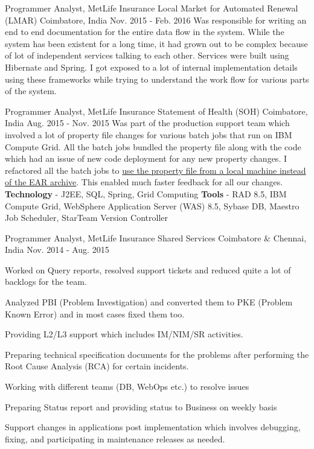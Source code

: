\begin{cventries}
  \cventry
    {Programmer Analyst, MetLife Insurance} %
    {Local Market for Automated Renewal (LMAR)} %
    {Coimbatore, India} %
    {Nov. 2015 - Feb. 2016} %
    {
        Was responsible for writing an end to end documentation for the entire data flow in the system. While the system has been existent for a long time, it had grown out to be complex because of lot of independent services talking to each other. Services were built using Hibernate and Spring. I got exposed to a lot of internal implementation details using these frameworks while trying to understand the work flow for various parts of the system.
    }

  \cventry
    {Programmer Analyst, MetLife Insurance} %
    {Statement of Health (SOH)} %
    {Coimbatore, India} %
    {Aug. 2015 - Nov. 2015} %
    {
        Was part of the production support team which involved a lot of property file changes for various batch jobs that run on IBM Compute Grid. All the batch jobs bundled the property file along with the code which had an issue of new code deployment for any new property changes. I refactored all the batch jobs to \underline{use the property file from a local machine instead of the EAR archive}. This enabled much faster feedback for all our changes.
        \newline
        \textbf{Technology} - J2EE, SQL, Spring, Grid Computing \newline
        \textbf{Tools} - RAD 8.5, IBM Compute Grid, WebSphere Application Server (WAS) 8.5, Sybase DB, Maestro Job Scheduler, StarTeam Version Controller
    }

  \cventry
    {Programmer Analyst, MetLife Insurance} %
    {Shared Services} %
    {Coimbatore \& Chennai, India} %
    {Nov. 2014 - Aug. 2015} %
    {
      \begin{cvitems}
        \item{Worked on Query reports, resolved support tickets and reduced quite a lot of backlogs for the team.}
        \item{Analyzed PBI (Problem Investigation) and converted them to PKE (Problem Known Error) and in most cases fixed them too.}
        \item{Providing L2/L3 support which includes IM/NIM/SR activities.}
        \item{Preparing technical specification documents for the problems after performing the Root Cause Analysis (RCA) for certain incidents.}
        \item{Working with different teams (DB, WebOps etc.) to resolve issues}
        \item{Preparing Status report and providing status to Business on weekly basis}
        \item{Support changes in applications post implementation which involves debugging, fixing, and participating in maintenance releases as needed.}
      \end{cvitems}
    }

\end{cventries}
